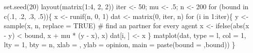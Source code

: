 \documentclass[
  a4paper,
  DIV=11,
  numbers=noendperiod,
  oneside]{scrreprt}
\newenvironment{Shaded}{}{}
\newcommand{\AttributeTok}[1]{\textcolor[rgb]{0.84,0.23,0.29}{#1}}
\newcommand{\CommentTok}[1]{\textcolor[rgb]{0.42,0.45,0.49}{#1}}
\newcommand{\ConstantTok}[1]{\textcolor[rgb]{0.00,0.36,0.77}{#1}}
\newcommand{\ControlFlowTok}[1]{\textcolor[rgb]{0.84,0.23,0.29}{#1}}
\newcommand{\DecValTok}[1]{\textcolor[rgb]{0.00,0.36,0.77}{#1}}
\newcommand{\FunctionTok}[1]{\textcolor[rgb]{0.44,0.26,0.76}{#1}}
\newcommand{\NormalTok}[1]{\textcolor[rgb]{0.14,0.16,0.18}{#1}}
\newcommand{\OtherTok}[1]{\textcolor[rgb]{0.44,0.26,0.76}{#1}}
\newcommand{\SpecialCharTok}[1]{\textcolor[rgb]{0.00,0.36,0.77}{#1}}
\newcommand{\StringTok}[1]{\textcolor[rgb]{0.01,0.18,0.38}{#1}}
\begin{document}
\begin{Shaded}
\begin{Highlighting}[]
\FunctionTok{set.seed}\NormalTok{(}\DecValTok{20}\NormalTok{)}
\FunctionTok{layout}\NormalTok{(}\FunctionTok{matrix}\NormalTok{(}\DecValTok{1}\SpecialCharTok{:}\DecValTok{4}\NormalTok{, }\DecValTok{2}\NormalTok{, }\DecValTok{2}\NormalTok{))}
\NormalTok{iter }\OtherTok{\textless{}{-}} \DecValTok{50}\NormalTok{; mu }\OtherTok{\textless{}{-}}\NormalTok{ .}\DecValTok{5}\NormalTok{; n }\OtherTok{\textless{}{-}} \DecValTok{200}
\ControlFlowTok{for}\NormalTok{ (bound }\ControlFlowTok{in} \FunctionTok{c}\NormalTok{(.}\DecValTok{1}\NormalTok{, .}\DecValTok{2}\NormalTok{, .}\DecValTok{3}\NormalTok{, .}\DecValTok{5}\NormalTok{))\{}
\NormalTok{  x }\OtherTok{\textless{}{-}} \FunctionTok{runif}\NormalTok{(n, }\DecValTok{0}\NormalTok{, }\DecValTok{1}\NormalTok{)}
\NormalTok{  dat }\OtherTok{\textless{}{-}} \FunctionTok{matrix}\NormalTok{(}\DecValTok{0}\NormalTok{, iter, n)}
  \ControlFlowTok{for}\NormalTok{ (i }\ControlFlowTok{in} \DecValTok{1}\SpecialCharTok{:}\NormalTok{iter)\{}
\NormalTok{    y }\OtherTok{\textless{}{-}} \FunctionTok{sample}\NormalTok{(x, n, }\AttributeTok{replace =} \ConstantTok{TRUE}\NormalTok{) }\CommentTok{\# find an partner for every agent}
\NormalTok{    x }\OtherTok{\textless{}{-}} \FunctionTok{ifelse}\NormalTok{(}\FunctionTok{abs}\NormalTok{(x }\SpecialCharTok{{-}}\NormalTok{ y) }\SpecialCharTok{\textless{}}\NormalTok{ bound, x }\SpecialCharTok{+}\NormalTok{ mu }\SpecialCharTok{*}\NormalTok{ (y }\SpecialCharTok{{-}}\NormalTok{ x), x)}
\NormalTok{    dat[i, ] }\OtherTok{\textless{}{-}}\NormalTok{ x}
\NormalTok{  \}}
  \FunctionTok{matplot}\NormalTok{(dat, }\AttributeTok{type =} \StringTok{\textquotesingle{}l\textquotesingle{}}\NormalTok{, }\AttributeTok{col =} \DecValTok{1}\NormalTok{, }\AttributeTok{lty =} \DecValTok{1}\NormalTok{, }\AttributeTok{bty =} \StringTok{\textquotesingle{}n\textquotesingle{}}\NormalTok{, }\AttributeTok{xlab =} \StringTok{\textquotesingle{}\textquotesingle{}}\NormalTok{,}
          \AttributeTok{ylab =} \StringTok{\textquotesingle{}opinion\textquotesingle{}}\NormalTok{, }\AttributeTok{main =} \FunctionTok{paste}\NormalTok{(}\StringTok{\textquotesingle{}bound = \textquotesingle{}}\NormalTok{,bound))}
\NormalTok{\}}
\end{Highlighting}
\end{Shaded}
\end{document}
